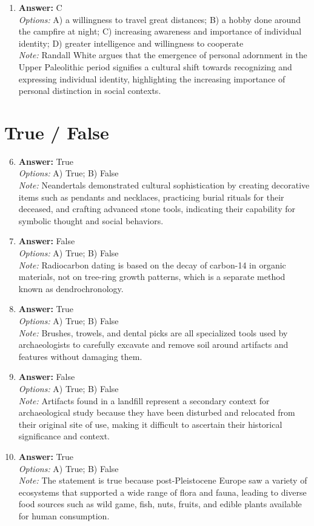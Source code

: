 \documentclass[12pt]{article}
\begin{document}
\begin{enumerate}[label=\arabic*.]
\item \textbf{Answer:} C
\\ \textit{Options:} A) a willingness to travel great distances; B) a hobby done around the campfire at night; C) increasing awareness and importance of individual identity; D) greater intelligence and willingness to cooperate
\\ \textit{Note:} Randall White argues that the emergence of personal adornment in the Upper Paleolithic period signifies a cultural shift towards recognizing and expressing individual identity, highlighting the increasing importance of personal distinction in social contexts.
\end{enumerate}

\section*{True / False}
\begin{enumerate}[label=\arabic*.]
\setcounter{enumi}{5}
\item \textbf{Answer:} True
\\ \textit{Options:} A) True; B) False
\\ \textit{Note:} Neandertals demonstrated cultural sophistication by creating decorative items such as pendants and necklaces, practicing burial rituals for their deceased, and crafting advanced stone tools, indicating their capability for symbolic thought and social behaviors.
\item \textbf{Answer:} False
\\ \textit{Options:} A) True; B) False
\\ \textit{Note:} Radiocarbon dating is based on the decay of carbon-14 in organic materials, not on tree-ring growth patterns, which is a separate method known as dendrochronology.
\item \textbf{Answer:} True
\\ \textit{Options:} A) True; B) False
\\ \textit{Note:} Brushes, trowels, and dental picks are all specialized tools used by archaeologists to carefully excavate and remove soil around artifacts and features without damaging them.
\item \textbf{Answer:} False
\\ \textit{Options:} A) True; B) False
\\ \textit{Note:} Artifacts found in a landfill represent a secondary context for archaeological study because they have been disturbed and relocated from their original site of use, making it difficult to ascertain their historical significance and context.
\item \textbf{Answer:} True
\\ \textit{Options:} A) True; B) False
\\ \textit{Note:} The statement is true because post-Pleistocene Europe saw a variety of ecosystems that supported a wide range of flora and fauna, leading to diverse food sources such as wild game, fish, nuts, fruits, and edible plants available for human consumption.
\end{enumerate}
\end{document}
